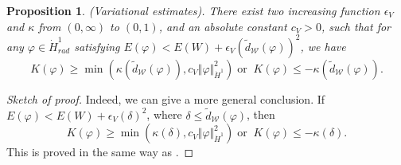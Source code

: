 \documentclass[reqno, 11pt]{amsart}
\numberwithin{equation}{section}
\theoremstyle{plain}
\newtheorem{proposition}[theorem]{Proposition}
\theoremstyle{definition}
\numberwithin{equation}{section}
\numberwithin{theorem}{section}
\numberwithin{equation}{section}
\numberwithin{equation}{section}
\numberwithin{theorem}{section}
\begin{document}
	\begin{proposition}(Variational estimates)\label{prop:vart est}. There exist two increasing function $\epsilon_V$ and $\kappa$ from $(0,\infty)$ to $(0,1)$, and an absolute constant $c_{V}>0$, such that for any $\varphi\in \dot H^1_{rad}$ satisfying $E(\varphi)<E(W)+\epsilon_V(\widetilde{d}_{\mathcal{W}}(\varphi))^2$, we have
		\begin{equation*}
		K(\varphi)\geq \min \left( \kappa(\widetilde{d}_{\mathcal{W}}(\varphi)),c_{V}\Vert \varphi \Vert_{\dot H^1}^2 \right) \;\text{or} \;\; K(\varphi)\leq -\kappa(\widetilde{d}_{\mathcal{W}}(\varphi)).
		\end{equation*}
	\end{proposition}
	\begin{proof}[Sketch of proof]	
		Indeed, we can give a more general conclusion. If $E(\varphi)<E(W)+\epsilon_{V}(\delta)^2$, where $\delta\leq\widetilde{d}_{\mathcal{W}}(\varphi)$, then
		\begin{equation*}
		K(\varphi)\geq \min \left( \kappa(\delta),c_{V}\Vert\varphi\Vert_{\dot H^1}^2 \right) \;\text{or} \;\; K(\varphi)\leq -\kappa(\delta).		
		\end{equation*}	
		This is proved in the same way as \cite[Lemmma 4.3]{NakS:NLKG}.
	\end{proof}
	
	
	
\end{document}

